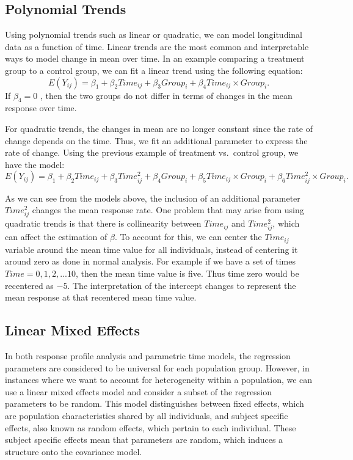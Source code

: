 \documentclass[12pt, twoside]{amherstthesis}
\begin{document}
\hypertarget{polynomial-trends}{%
\subsection{Polynomial Trends}\label{polynomial-trends}}

Using polynomial trends such as linear or quadratic, we can model longitudinal data as a function of time. Linear trends are the most common and interpretable ways to model change in mean over time. In an example comparing a treatment group to a control group, we can fit a linear trend using the following equation: \[E(Y_{ij}) = \beta_1 + \beta_2Time_{ij}+\beta_3Group_i+\beta_4Time_{ij} \times Group_i.\] If \(\beta_4 = 0\) , then the two groups do not differ in terms of changes in the mean response over time.

For quadratic trends, the changes in mean are no longer constant since the rate of change depends on the time. Thus, we fit an additional parameter to express the rate of change.
Using the previous example of treatment vs.~control group, we have the model:
\[E(Y_{ij}) = \beta_1 + \beta_2Time_{ij}+\beta_3Time^2_{ij}+\beta_4Group_i + \beta_5Time_{ij} \times Group_i + \beta_6Time^2_{ij} \times Group_i.\]

As we can see from the models above, the inclusion of an additional parameter \(Time^2_{ij}\) changes the mean response rate. One problem that may arise from using quadratic trends is that there is collinearity between \(Time_{ij}\) and \(Time^2_{ij}\), which can affect the estimation of \(\beta\). To account for this, we can center the \(Time_{ij}\) variable around the mean time value for all individuals, instead of centering it around zero as done in normal analysis. For example if we have a set of times \(Time = {0,1,2,...10}\), then the mean time value is five. Thus time zero would be recentered as \(-5\). The interpretation of the intercept changes to represent the mean response at that recentered mean time value.

\hypertarget{linear-mixed-effects}{%
\subsection{Linear Mixed Effects}\label{linear-mixed-effects}}

In both response profile analysis and parametric time models, the regression parameters are considered to be universal for each population group. However, in instances where we want to account for heterogeneity within a population, we can use a linear mixed effects model and consider a subset of the regression parameters to be random. This model distinguishes between fixed effects, which are population characteristics shared by all individuals, and subject specific effects, also known as random effects, which pertain to each individual. These subject specific effects mean that parameters are random, which induces a structure onto the covariance model.
\end{document}
